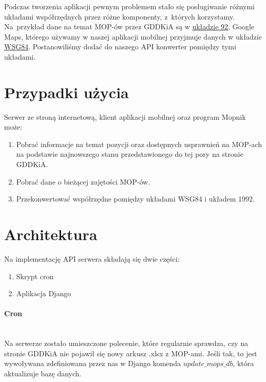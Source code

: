 Podczas tworzenia aplikacji pewnym problemem stało się posługiwanie różnymi układami współrzędnych przez różne komponenty, z~których korzystamy. Na~przykład dane na temat MOP-ów przez GDDKiA są w \href{https://pl.wikipedia.org/wiki/Uk\%C5\%82ad_wsp\%C3\%B3\%C5\%82rz\%C4\%99dnych_1992}{układzie 92}, Google Maps, którego używamy w naszej aplikacji mobilnej przyjmuje danych w układzie \href{https://pl.wikipedia.org/wiki/System_odniesienia_WGS_84}{WSG84}. Postanowiliśmy dodać do naszego API konwerter pomiędzy tymi układami.
\section{Przypadki użycia}
Serwer ze stroną internetową, klient aplikacji mobilnej oraz program Mopnik może:
\begin{enumerate}
\item Pobrać informacje na temat pozycji oraz dostępnych usprawnień na MOP-ach na podstawie najnowszego stanu przedstawionego do tej pory na stronie GDDKiA.
\item Pobrać dane o bieżącej zajętości MOP-ów.
\item Przekonwertować współrzędne pomiędzy układami WSG84 i układem 1992.
\end{enumerate}
\section{Architektura}
Na implementację API serwera składają się dwie części:
\begin{enumerate}
\item Skrypt cron
\item Aplikacja Django
\end{enumerate}
\paragraph{Cron}\mbox{}\\
Na serwerze zostało umieszczone polecenie, które regularnie sprawdza, czy na stronie GDDKiA nie pojawił się nowy arkusz .xlsx z MOP-ami. Jeśli tak, to jest wywoływana zdefiniowana przez nas w Django komenda $\textit{update\_mops\_db}$, która aktualizuje bazę danych.
